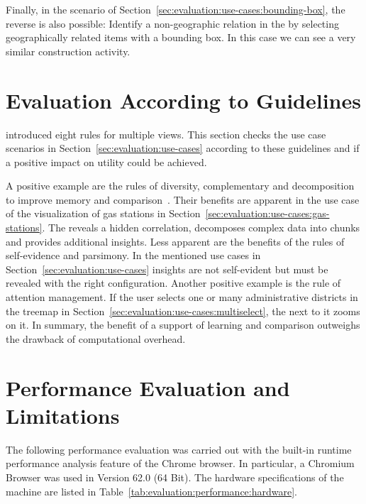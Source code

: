 Finally, in the scenario of Section~\ref{sec:evaluation:use-cases:bounding-box}, the reverse is also possible:
Identify a non-geographic relation in the \tmap{} by selecting geographically related items with a bounding box.
In this case we can see a very similar construction activity.

\section{Evaluation According to Guidelines}
\textcite{Baldonado2000} introduced eight rules for multiple views.
This section checks the use case scenarios in Section~\ref{sec:evaluation:use-cases} according to these guidelines and if a positive impact on utility could be achieved.

A positive example are the rules of diversity, complementary and decomposition to improve memory and comparison~\parencite{Baldonado2000}.
Their benefits are apparent in the use case of the visualization of gas stations in Section~\ref{sec:evaluation:use-cases:gas-stations}.
The \gv{} reveals a hidden correlation, decomposes complex data into chunks and provides additional insights.
Less apparent are the benefits of the rules of self-evidence and parsimony.
In the mentioned use cases in Section~\ref{sec:evaluation:use-cases} insights are not self-evident but must be revealed with the right configuration.
Another positive example is the rule of attention management.
If the user selects one or many administrative districts in the treemap in Section~\ref{sec:evaluation:use-cases:multiselect}, the \gv{} next to it zooms on it.
In summary, the benefit of a support of learning and comparison outweighs the drawback of computational overhead.



\section{Performance Evaluation and Limitations}\label{sec:evaluation:performance}


The following performance evaluation was carried out with the built-in runtime performance analysis feature of the Chrome browser.
In particular, a Chromium Browser was used in Version 62.0 (64 Bit).
The hardware specifications of the machine are listed in Table~\ref{tab:evaluation:performance:hardware}.

